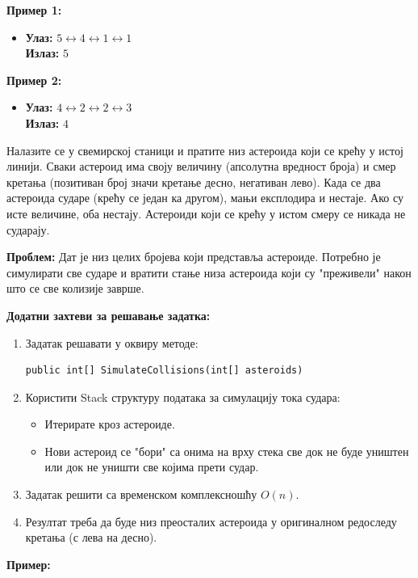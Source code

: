 \textbf{Пример 1:}
\begin{itemize}
	\item \textbf{Улаз:} $5 \leftrightarrow 4 \leftrightarrow 1 \leftrightarrow 1$ \\
	      \textbf{Излаз:} $5$
\end{itemize}

\textbf{Пример 2:}
\begin{itemize}
	\item \textbf{Улаз:} $4 \leftrightarrow 2 \leftrightarrow 2 \leftrightarrow 3$ \\
	      \textbf{Излаз:} $4$
\end{itemize}

Налазите се у свемирској станици и пратите низ астероида који се крећу у истој линији. Сваки астероид има своју величину (апсолутна вредност броја) и смер кретања (позитиван број значи кретање десно, негативан лево). Када се два астероида сударе (крећу се један ка другом), мањи експлодира и нестаје. Ако су исте величине, оба нестају. Астероиди који се крећу у истом смеру се никада не сударају.

\textbf{Проблем:} Дат је низ целих бројева који представља астероиде. Потребно је симулирати све сударе и вратити стање низа астероида који су "преживели" након што се све колизије заврше.

\textbf{Додатни захтеви за решавање задатка:}
\begin{enumerate}
	\item Задатак решавати у оквиру методе:
	\begin{Verbatim}[fontsize=\small]
public int[] SimulateCollisions(int[] asteroids)
	\end{Verbatim}
	\item Користити Stack структуру података за симулацију тока судара:
	\begin{itemize}
		\item Итерирате кроз астероиде.
		\item Нови астероид се "бори" са онима на врху стека све док не буде уништен или док не уништи све којима прети судар.
	\end{itemize}
	\item Задатак решити са временском комплексношћу $O(n)$.
	\item Резултат треба да буде низ преосталих астероида у оригиналном редоследу кретања (с лева на десно).
\end{enumerate}

\textbf{Пример:}


